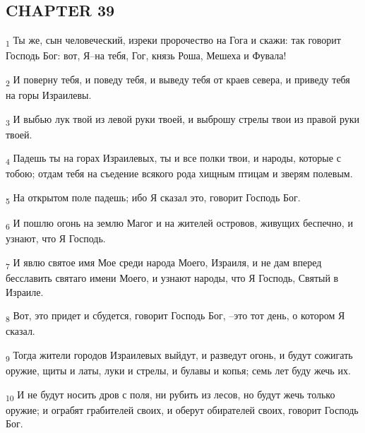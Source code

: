 \subsection{CHAPTER 39}
\begin{tcolorbox}
\textsubscript{1} Ты же, сын человеческий, изреки пророчество на Гога и скажи: так говорит Господь Бог: вот, Я--на тебя, Гог, князь Роша, Мешеха и Фувала!
\end{tcolorbox}
\begin{tcolorbox}
\textsubscript{2} И поверну тебя, и поведу тебя, и выведу тебя от краев севера, и приведу тебя на горы Израилевы.
\end{tcolorbox}
\begin{tcolorbox}
\textsubscript{3} И выбью лук твой из левой руки твоей, и выброшу стрелы твои из правой руки твоей.
\end{tcolorbox}
\begin{tcolorbox}
\textsubscript{4} Падешь ты на горах Израилевых, ты и все полки твои, и народы, которые с тобою; отдам тебя на съедение всякого рода хищным птицам и зверям полевым.
\end{tcolorbox}
\begin{tcolorbox}
\textsubscript{5} На открытом поле падешь; ибо Я сказал это, говорит Господь Бог.
\end{tcolorbox}
\begin{tcolorbox}
\textsubscript{6} И пошлю огонь на землю Магог и на жителей островов, живущих беспечно, и узнают, что Я Господь.
\end{tcolorbox}
\begin{tcolorbox}
\textsubscript{7} И явлю святое имя Мое среди народа Моего, Израиля, и не дам вперед бесславить святаго имени Моего, и узнают народы, что Я Господь, Святый в Израиле.
\end{tcolorbox}
\begin{tcolorbox}
\textsubscript{8} Вот, это придет и сбудется, говорит Господь Бог, --это тот день, о котором Я сказал.
\end{tcolorbox}
\begin{tcolorbox}
\textsubscript{9} Тогда жители городов Израилевых выйдут, и разведут огонь, и будут сожигать оружие, щиты и латы, луки и стрелы, и булавы и копья; семь лет буду жечь их.
\end{tcolorbox}
\begin{tcolorbox}
\textsubscript{10} И не будут носить дров с поля, ни рубить из лесов, но будут жечь только оружие; и ограбят грабителей своих, и оберут обирателей своих, говорит Господь Бог.
\end{tcolorbox}
